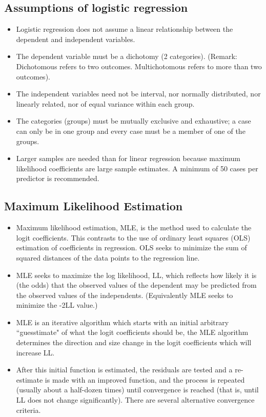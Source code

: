 \documentclass[a4paper,12pt]{article}
\begin{document}
\subsection{Assumptions of logistic regression}
\begin{itemize}
\item Logistic regression does not assume a linear relationship between the dependent and
independent variables.
\item The dependent variable must be a dichotomy (2 categories).
(Remark: Dichotomous refers to two outcomes. Multichotomous refers to more than two outcomes).
\item The independent variables need not be interval, nor normally distributed, nor linearly
related, nor of equal variance within each group.
\item The categories (groups) must be mutually exclusive and exhaustive; a case can only be
in one group and every case must be a member of one of the groups.
\item Larger samples are needed than for linear regression because maximum likelihood
coefficients are large sample estimates. A minimum of 50 cases per predictor is
recommended.
\end{itemize}
\subsection{Maximum Likelihood Estimation}
\begin{itemize}
	\item Maximum likelihood estimation, MLE, is the method used to calculate the logit coefficients. This contrasts to the use of ordinary least squares (OLS) estimation of coefficients in regression. OLS seeks to minimize the sum of squared distances of the data points to the regression line. 
	\item MLE seeks to maximize the log likelihood, LL, which reflects how likely it is (the odds) that the observed values of the dependent may be predicted from the observed values of the independents. (Equivalently MLE seeks to minimize the -2LL value.)
	
\item 	MLE is an iterative algorithm which starts with an initial arbitrary ``guesstimate" of what the logit coefficients should be, the MLE algorithm determines the direction and size change in the logit coefficients which will increase LL.
\item  After this initial function is estimated, the residuals are tested and a re-estimate is made with an improved function, and the process is repeated (usually about a half-dozen times) until convergence is reached (that is, until LL does not change significantly). There are several alternative convergence criteria.
\end{itemize}
\end{document}
